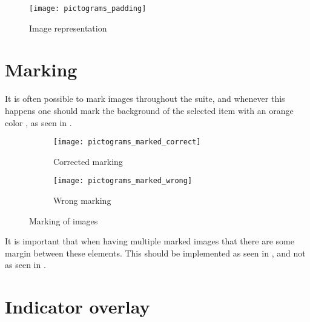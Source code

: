 \begin{figure}[h]
	\centering
	\texttt{[image: pictograms\_padding]}
	\caption{Image representation}
	\label{fig:pictograms_padding}
\end{figure} 
\FloatBarrier

\section{Marking}
\label{sec:marking}
It is often possible to mark images throughout the suite, and whenever this happens one should mark the background of the selected item with an orange color , as seen in . 

\begin{figure}[!htbp]
    \centering

    \begin{subfigure}[t]{0.4\textwidth}
    	\centering
        \texttt{[image: pictograms\_marked\_correct]}
        \caption{Corrected marking}
        \label{fig:pictograms_marked_corect}
    \end{subfigure}
    \hspace{5em} 
    \begin{subfigure}[t]{0.4\textwidth}
    	\centering
        \texttt{[image: pictograms\_marked\_wrong]}
        \caption{Wrong marking}
        \label{fig:pictograms_marked_wrong}
    \end{subfigure}
    
    \caption{Marking of images}
    \label{fig:pictograms_marked}
\end{figure}

\begin{note}
	It is important that when having multiple marked images that there are some margin between these elements. This should be implemented as seen in , and not as seen in .
\end{note} 

\section{Indicator overlay}
\label{sec:indicator_overlay}

